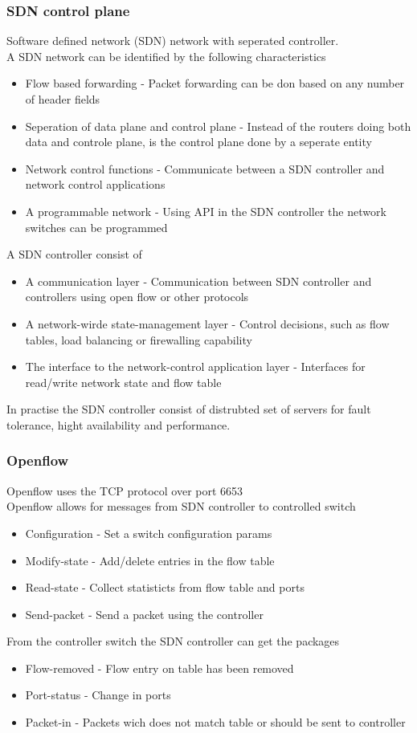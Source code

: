 \documentclass[12pt, a4paper]{article}
\begin{document}
			\subsubsection{SDN control plane}
				Software defined network (SDN) network with seperated controller.\\
				A SDN network can be identified by the following characteristics
				\begin{itemize}
					\item Flow based forwarding - Packet forwarding can be don based on any number of header fields
					\item Seperation of data plane and control plane - Instead of the routers doing both data and controle plane, is the control plane done by a seperate entity
					\item Network control functions - Communicate between a SDN controller and network control applications
					\item A programmable network - Using API in the SDN controller the network switches can be programmed
				\end{itemize}
				A SDN controller consist of 
				\begin{itemize}
					\item A communication layer - Communication between SDN controller and controllers using open flow or other protocols
					\item A network-wirde state-management layer - Control decisions, such as flow tables, load balancing or firewalling capability
					\item The interface to the network-control application layer - Interfaces for read/write network state and flow table
				\end{itemize}
				In practise the SDN controller consist of distrubted set of servers for fault tolerance, hight availability and performance.
			\subsubsection{Openflow}
				Openflow uses the TCP protocol over port 6653\\
				Openflow allows for messages from SDN controller to controlled switch 
				\begin{itemize}
					\item Configuration - Set a switch configuration params
					\item Modify-state - Add/delete entries in the flow table
					\item Read-state - Collect statisticts from flow table and ports
					\item Send-packet - Send a packet using the controller
				\end{itemize}
				From the controller switch the SDN controller can get the packages
				\begin{itemize}
					\item Flow-removed - Flow entry on table has been removed
					\item Port-status - Change in ports
					\item Packet-in - Packets wich does not match table or should be sent to controller
				\end{itemize}
\end{document}
